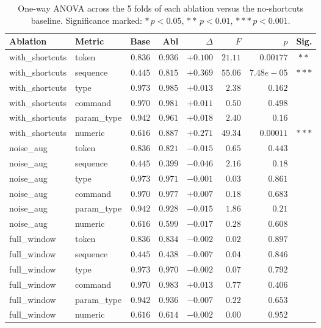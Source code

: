 \begin{table}[h]
\centering
\caption{One-way ANOVA across the 5 folds of each ablation versus the no-shortcuts baseline. Significance marked: $\ast\,p<0.05$, $\ast\ast\,p<0.01$, $\ast\ast\ast\,p<0.001$.}
\label{tab:anova}
\small
\begin{tabular}{l l r r r r r c}
\toprule
Ablation & Metric & Base & Abl & $\Delta$ & $F$ & $p$ & Sig. \\
\midrule
with\_shortcuts & token & $0.836$ & $0.936$ & $+0.100$ & $21.11$ & $0.00177$ & $\ast\ast$ \\
with\_shortcuts & sequence & $0.445$ & $0.815$ & $+0.369$ & $55.06$ & $7.48e-05$ & $\ast\ast\ast$ \\
with\_shortcuts & type & $0.973$ & $0.985$ & $+0.013$ & $2.38$ & $0.162$ &  \\
with\_shortcuts & command & $0.970$ & $0.981$ & $+0.011$ & $0.50$ & $0.498$ &  \\
with\_shortcuts & param\_type & $0.942$ & $0.961$ & $+0.018$ & $2.40$ & $0.16$ &  \\
with\_shortcuts & numeric & $0.616$ & $0.887$ & $+0.271$ & $49.34$ & $0.00011$ & $\ast\ast\ast$ \\
noise\_aug & token & $0.836$ & $0.821$ & $-0.015$ & $0.65$ & $0.443$ &  \\
noise\_aug & sequence & $0.445$ & $0.399$ & $-0.046$ & $2.16$ & $0.18$ &  \\
noise\_aug & type & $0.973$ & $0.971$ & $-0.001$ & $0.03$ & $0.861$ &  \\
noise\_aug & command & $0.970$ & $0.977$ & $+0.007$ & $0.18$ & $0.683$ &  \\
noise\_aug & param\_type & $0.942$ & $0.928$ & $-0.015$ & $1.86$ & $0.21$ &  \\
noise\_aug & numeric & $0.616$ & $0.599$ & $-0.017$ & $0.28$ & $0.608$ &  \\
full\_window & token & $0.836$ & $0.834$ & $-0.002$ & $0.02$ & $0.897$ &  \\
full\_window & sequence & $0.445$ & $0.438$ & $-0.007$ & $0.04$ & $0.846$ &  \\
full\_window & type & $0.973$ & $0.970$ & $-0.002$ & $0.07$ & $0.792$ &  \\
full\_window & command & $0.970$ & $0.983$ & $+0.013$ & $0.77$ & $0.406$ &  \\
full\_window & param\_type & $0.942$ & $0.936$ & $-0.007$ & $0.22$ & $0.653$ &  \\
full\_window & numeric & $0.616$ & $0.614$ & $-0.002$ & $0.00$ & $0.952$ &  \\

\end{tabular}
\end{table}
